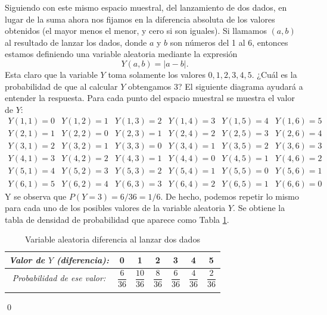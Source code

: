 \begin{Ejemplo}
    Siguiendo con este mismo espacio muestral, del lanzamiento de dos dados, en lugar de la suma ahora nos fijamos en la diferencia absoluta de los valores obtenidos (el mayor menos el menor, y cero si son iguales). Si llamamos $(a,b)$ al resultado de lanzar los dados, donde $a$ y $b$ son números del 1 al 6, entonces estamos definiendo una variable aleatoria mediante la expresión
    \[Y(a,b)=|a-b|.\]
    Esta claro que la variable $Y$ toma solamente los valores $0,1,2,3,4,5$. ¿Cuál es la probabilidad de que al calcular $Y$ obtengamos $3$? El siguiente diagrama ayudará a entender la respuesta. Para cada punto del espacio muestral se muestra el valor de $Y$:
    \[
    \begin{array}{cccccc}
    Y(1,1)=0&Y(1,2)=1&Y(1,3)=2&Y(1,4)=3&Y(1,5)=4&Y(1,6)=5\\
    Y(2,1)=1&Y(2,2)=0&Y(2,3)=1&Y(2,4)=2&Y(2,5)=3&Y(2,6)=4\\
    Y(3,1)=2&Y(3,2)=1&Y(3,3)=0&Y(3,4)=1&Y(3,5)=2&Y(3,6)=3\\
    Y(4,1)=3&Y(4,2)=2&Y(4,3)=1&Y(4,4)=0&Y(4,5)=1&Y(4,6)=2\\
    Y(5,1)=4&Y(5,2)=3&Y(5,3)=2&Y(5,4)=1&Y(5,5)=0&Y(5,6)=1\\
    Y(6,1)=5&Y(6,2)=4&Y(6,3)=3&Y(6,4)=2&Y(6,5)=1&Y(6,6)=0
    \end{array}
    \]
    Y se observa que $P(Y=3)=6/36=1/6$. De hecho, podemos repetir lo mismo para cada uno de los posibles valores de la variable aleatoria $Y$. Se obtiene la tabla de densidad de probabilidad que aparece como Tabla \ref{cap04:tabla:VariableAleatoriaDiferencia2Dados}.
    \begin{table}[ht]
    \begin{center}
    \begin{tabular}[t]{|c|c|c|c|c|c|c|}
    \hline
    \rule{0cm}{0.5cm}{\em Valor de $Y$ (diferencia):}&0&1&2&3&4&5\\
    \hline
    \rule{0cm}{0.7cm}{\em Probabilidad de ese valor:}&$\dfrac{6}{36}$&$\dfrac{10}{36}$&$\dfrac{8}{36}$&$\dfrac{6}{36}$&$\dfrac{4}{36}$&$\dfrac{2}{36}$\\
    &&&&&&\\
    \hline
    \end{tabular}
    \end{center}
    \caption{Variable aleatoria diferencia al lanzar dos dados}\label{cap04:tabla:VariableAleatoriaDiferencia2Dados}
    \end{table}
    \qed
\end{Ejemplo}


